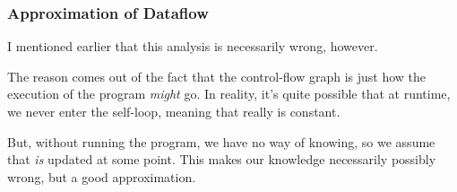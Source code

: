 \documentclass[aspectratio=169, handout]{beamer}
\begin{document}
 \begin{frame}[fragile]
   \frametitle{Approximation of Dataflow}
   \begin{center}
     \begin{minipage}{0.65\textwidth}
       \raggedright
       I mentioned earlier that this analysis is necessarily wrong, however.

       \vspace{10pt}

       The reason comes out of the fact that the control-flow graph is just how
       the execution of the program \textit{might} go. In reality, it's quite
       possible that at runtime, we never enter the self-loop, meaning that
        really is constant.

       \vspace{10pt}

       But, without running the program, we have no way of knowing, so we
       assume that  \textit{is} updated at some point. This makes
       our knowledge necessarily possibly wrong, but a good approximation.
     \end{minipage}
     \begin{minipage}{0.3\textwidth}
       \centering
     \end{minipage}
   \end{center}
 \end{frame}
\end{document}
